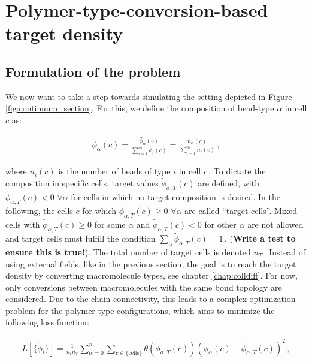 \documentclass[bachelor,       %
               twoside,        %
               BCOR10mm,       %
               ngerman, english %
               ]{GAUBM}
\begin{document}
\chapter{Polymer-type-conversion-based target density}
\section{Formulation of the problem}
We now want to take a step towards simulating the setting depicted in Figure \ref{fig:continuum_section}. For this, we define the composition of bead-type $\alpha$ in cell $c$ as:

\begin{align}
    \tilde\phi_\alpha(c)=\frac{\hat\phi_\alpha(c)}{\sum_{i=1}^{n_t}\hat\phi_i(c)}=\frac{n_\alpha(c)}{\sum_{i=1}^{n_t}n_i(c)}\,,
\end{align}

where $n_i(c)$ is the number of beads of type $i$ in cell $c\,.$ To dictate the composition in specific cells, target values $\tilde\phi_{\alpha,T}(c)$ are defined, with $\tilde\phi_{\alpha,T}(c)<0$ $\forall\alpha$ for cells in which no target composition is desired. In the following, the cells $c$ for which $\tilde\phi_{\alpha,T}(c)\ge 0$ $\forall\alpha$ are called \enquote{target cells}. Mixed cells with $\tilde\phi_{\alpha,T}(c)\ge 0$ for some $\alpha$ and $\tilde\phi_{\alpha,T}(c)<0$ for other $\alpha$ are not allowed and target cells must fulfill the condition $\sum_\alpha\tilde\phi_{\alpha,T}(c)=1\, .$  (\textbf{Write a test to ensure this is true!}). The total number of target cells is denoted $n_T\,.$ Instead of using external fields, like in the previous section, the goal is to reach the target density by converting macromolecule types, see chapter \ref{chap:colldiff}. For now, only conversions between macromolecules with the same bond topology are considered. Due to the chain connectivity, this leads to a complex optimization problem for the polymer type configurations, which aims to minimize the following loss function:

\begin{align}
    L[\{\tilde\phi_i\}]=\frac{1}{n_tn_T}\sum_{\alpha=0}^{n_t}\sum_{c\in \{\text{cells}\}}\theta(\tilde{\phi}_{\alpha,T}(c))\left(\tilde{\phi}_\alpha(c)-\tilde{\phi}_{\alpha,T}(c)\right)^2\,,
    \label{eq:lossfunction}
\end{align}
\end{document}
